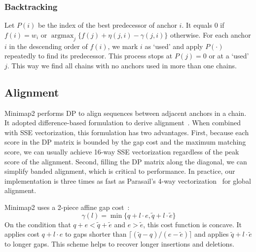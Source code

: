 \documentclass{bioinfo}
\DeclareMathOperator*{\argmax}{argmax}
\begin{document}
\begin{methods}
\subsubsection{Backtracking}
Let $P(i)$ be the index of the best predecessor of anchor $i$. It equals 0 if
$f(i)=w_i$ or $\argmax_j\{f(j)+\eta(j,i)-\gamma(j,i)\}$ otherwise. For each
anchor $i$ in the descending order of $f(i)$, we mark $i$ as `used' and apply
$P(\cdot)$ repeatedly to find its predecessor. This process stops at $P(j)=0$
or at a `used' $j$. This way we find all chains with no anchors used in
more than one chains.

\subsection{Alignment}
Minimap2 performs DP to align sequences between adjacent anchors in a chain. It
adopted difference-based formulation to derive
alignment~\citep{Wu:1996aa,Suzuki:2016}. When combined with SSE vectorization,
this formulation has two advantages. First, because each score in the DP matrix
is bounded by the gap cost and the maximum matching score, we can usually
achieve 16-way SSE vectorization regardless of the peak score of the
alignment. Second, filling the DP matrix along the diagonal, we can simplify
banded alignment, which is critical to performance. In practice, our
implementation is three times as fast as Parasail's 4-way
vectorization~\citep{Daily:2016aa} for global alignment.


Minimap2 uses a 2-piece affine gap cost~\citep{Gotoh:1990aa}:
\[
\gamma(l)=\min\{q+l\cdot e,\tilde{q}+l\cdot\tilde{e}\}
\]
On the condition that $q+e<\tilde{q}+\tilde{e}$ and $e>\tilde{e}$, this
cost function is concave. It applies cost $q+l\cdot e$ to gaps shorter than
$\lceil(\tilde{q}-q)/(e-\tilde{e})\rceil$ and applies
$\tilde{q}+l\cdot\tilde{e}$ to longer gaps. This scheme helps to recover
longer insertions and deletions.


\end{methods}
\end{document}
